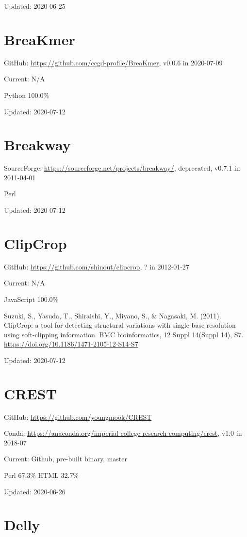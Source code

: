 \documentclass[]{article}
\begin{document}
Updated: 2020-06-25

\section{BreaKmer}

GitHub: \url{https://github.com/ccgd-profile/BreaKmer}, v0.0.6 in 2020-07-09

Current: N/A

Python 100.0\%

Updated: 2020-07-12

\section{Breakway}

SourceForge: \url{https://sourceforge.net/projects/breakway/}, deprecated, v0.7.1 in 2011-04-01

Perl

Updated: 2020-07-12

\section{ClipCrop}

GitHub: \url{https://github.com/shinout/clipcrop}, ? in 2012-01-27

Current: N/A

JavaScript 100.0\%

Suzuki, S., Yasuda, T., Shiraishi, Y., Miyano, S., \& Nagasaki, M. (2011). ClipCrop: a tool for detecting structural variations with single-base resolution using soft-clipping information. BMC bioinformatics, 12 Suppl 14(Suppl 14), S7. \url{https://doi.org/10.1186/1471-2105-12-S14-S7}

Updated: 2020-07-12

\section{CREST}

GitHub: \url{https://github.com/youngmook/CREST}

Conda: \url{https://anaconda.org/imperial-college-research-computing/crest}, v1.0 in 2018-07

Current: Github, pre-built binary, master

Perl 67.3\% HTML 32.7\%

Updated: 2020-06-26

\section{Delly}
\end{document}
